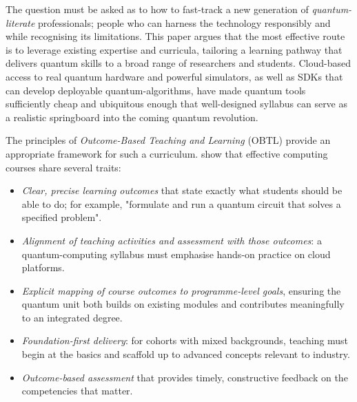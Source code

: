 The question must be asked as to how to fast-track a new generation of \emph{quantum-literate} professionals; 
people who can harness the technology responsibly and while recognising its limitations.
This paper argues that the most effective route is to leverage existing expertise and curricula,
tailoring a learning pathway that delivers quantum skills to a broad range of researchers and students.
Cloud-based access to real quantum hardware and powerful simulators, as well as SDKs that can develop deployable quantum-algorithms, 
have made quantum tools sufficiently cheap and ubiquitous enough that 
well-designed syllabus can serve as a realistic springboard into the coming quantum revolution.

%

The principles of \emph{Outcome-Based Teaching and Learning} (OBTL) provide an appropriate framework for such a curriculum.
\citeauthor{Wong:2011} \cite{Wong:2011} show that
effective computing courses share several traits:
\begin{itemize}
	\item \emph{Clear, precise learning outcomes} that state exactly what students should be able to do; for example, "formulate and run a quantum circuit that solves a specified problem".
	\item \emph{Alignment of teaching activities and assessment with those outcomes}: a quantum-computing syllabus must emphasise hands-on practice on cloud platforms.
	\item \emph{Explicit mapping of course outcomes to programme-level goals}, ensuring the quantum unit both builds on existing modules and contributes meaningfully to an integrated degree.
	\item \emph{Foundation-first delivery}: for cohorts with mixed backgrounds, teaching must begin at the basics and scaffold up to advanced concepts relevant to industry.
	\item \emph{Outcome-based assessment} that provides timely, constructive feedback on the competencies that matter.
\end{itemize}

